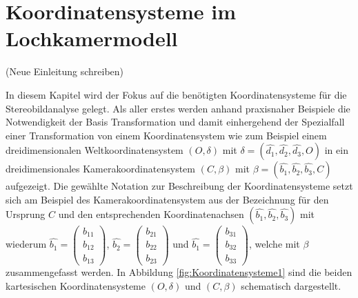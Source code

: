 \chapter{Koordinatensysteme im Lochkamermodell}
\label{sec:basisTransformation} 

(Neue Einleitung schreiben)
 
In diesem Kapitel wird der Fokus auf die benötigten Koordinatensysteme für die Stereobildanalyse gelegt. Als aller erstes werden anhand praxisnaher Beispiele die Notwendigkeit der Basis Transformation und damit einhergehend der Spezialfall einer Transformation von einem Koordinatensystem wie zum Beispiel einem dreidimensionalen Weltkoordinatensystem $(O,\delta)$ mit $\delta=(\hat{d_1}, \hat{d_2},\hat{d_3},O)$ in ein dreidimensionales Kamerakoordinatensystem $(C,\beta)$ mit $\beta=(\hat{b_1},\hat{b_2},\hat{b_3},C)$ aufgezeigt. Die gewählte Notation zur Beschreibung der Koordinatensysteme setzt sich am Beispiel des Kamerakoordinatensystem aus der Bezeichnung für den Ursprung $C$ und den entsprechenden Koordinatenachsen $(\hat{b_1},\hat{b_2},\hat{b_3})$ mit wiederum $\hat{b_1} = \begin{pmatrix}b_{11}\\b_{12}\\b_{13}\end{pmatrix}$, $\hat{b_2} = \begin{pmatrix}b_{21}\\b_{22}\\b_{23}\end{pmatrix}$ und $\hat{b_1} = \begin{pmatrix}b_{31}\\b_{32}\\b_{33}\end{pmatrix}$, welche mit $\beta$ zusammengefasst werden. In Abbildung \ref{fig:Koordinatensysteme1} sind die beiden kartesischen Koordinatensysteme $(O,\delta)$ und $(C,\beta)$ schematisch dargestellt. 

%
%
%

